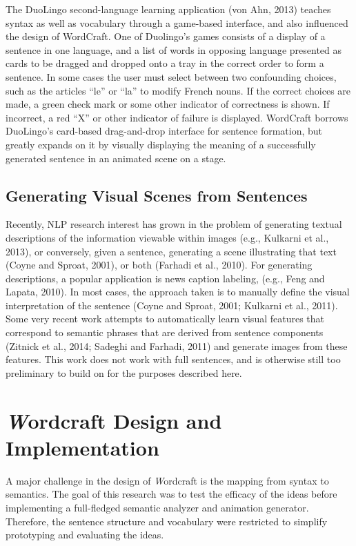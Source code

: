 \documentclass{sigchi-ext}
\begin{document}
 The DuoLingo second-language learning application (von Ahn, 2013) teaches syntax as well as vocabulary through a game-based interface, and also influenced the design of WordCraft.  One of Duolingo’s games consists of a display of a sentence in one language, and a list of words in opposing language presented as cards to be dragged and dropped onto a tray in the correct order to form a sentence.  In some cases the user must select between two confounding choices, such as the articles “le” or “la” to modify French nouns.  If the correct choices are made, a green check mark or some other indicator of correctness is shown.  If incorrect, a red “X” or other indicator of failure is displayed.  WordCraft borrows DuoLingo’s card-based drag-and-drop interface for sentence formation, but greatly expands on it by visually displaying the meaning of a successfully generated sentence in an animated scene on a stage.


\subsection{Generating Visual Scenes from Sentences}
Recently, NLP research interest has grown in the problem of generating textual descriptions of the information viewable within images (e.g., Kulkarni et al., 2013), or conversely, given a sentence, generating a scene illustrating that text (Coyne and Sproat, 2001), or both (Farhadi et al., 2010).  For generating descriptions, a popular application is news caption labeling, (e.g., Feng and Lapata, 2010). In most cases, the approach taken is to manually define the visual interpretation of the sentence (Coyne and Sproat, 2001; Kulkarni et al., 2011).  Some very recent work  attempts to automatically learn visual features that correspond to semantic phrases that are derived from sentence components (Zitnick et al., 2014; Sadeghi and Farhadi, 2011) and generate images from these features.  This work does not work with full sentences, and is otherwise still too preliminary to build on for the purposes described here.


\section{\emph Wordcraft Design and Implementation}
A major challenge in the design of \emph Wordcraft is the mapping from syntax to semantics.  The goal of this research was to test the efficacy of the ideas before implementing a full-fledged semantic analyzer and animation generator.  Therefore, the sentence structure and vocabulary were  restricted to simplify prototyping and evaluating the ideas.
\end{document}
